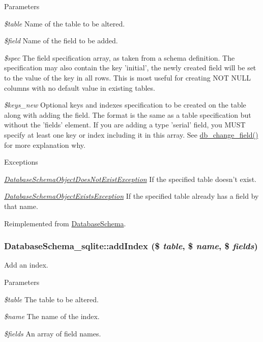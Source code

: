 \begin{DoxyParams}{Parameters}
\item[{\em \$table}]Name of the table to be altered. \item[{\em \$field}]Name of the field to be added. \item[{\em \$spec}]The field specification array, as taken from a schema definition. The specification may also contain the key 'initial', the newly created field will be set to the value of the key in all rows. This is most useful for creating NOT NULL columns with no default value in existing tables. \item[{\em \$keys\_\-new}]Optional keys and indexes specification to be created on the table along with adding the field. The format is the same as a table specification but without the 'fields' element. If you are adding a type 'serial' field, you MUST specify at least one key or index including it in this array. See \hyperlink{group__schemaapi_ga9e0a4211eb8137e187d5f3f4fa716cea}{db\_\-change\_\-field()} for more explanation why.\end{DoxyParams}

\begin{DoxyExceptions}{Exceptions}
\item[{\em \hyperlink{classDatabaseSchemaObjectDoesNotExistException}{DatabaseSchemaObjectDoesNotExistException}}]If the specified table doesn't exist. \item[{\em \hyperlink{classDatabaseSchemaObjectExistsException}{DatabaseSchemaObjectExistsException}}]If the specified table already has a field by that name. \end{DoxyExceptions}


Reimplemented from \hyperlink{classDatabaseSchema_a54800af6c4094cea196e1c66b5106c99}{DatabaseSchema}.\hypertarget{classDatabaseSchema__sqlite_af6c71cb38c8cf5b8e37fe00d9c32861c}{
\subsubsection[{addIndex}]{\setlength{\rightskip}{0pt plus 5cm}DatabaseSchema\_\-sqlite::addIndex (\$ {\em table}, \/  \$ {\em name}, \/  \$ {\em fields})}}
\label{classDatabaseSchema__sqlite_af6c71cb38c8cf5b8e37fe00d9c32861c}
Add an index.


\begin{DoxyParams}{Parameters}
\item[{\em \$table}]The table to be altered. \item[{\em \$name}]The name of the index. \item[{\em \$fields}]An array of field names.\end{DoxyParams}

